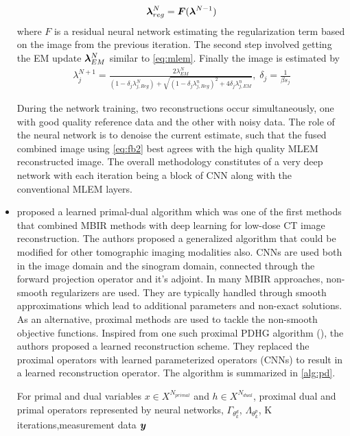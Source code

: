 \begin{itemize}
\begin{equation}\label{eq:fbs1}
\bm{\lambda}_{reg}^N = \bm{F}(\bm{\lambda}^{N-1})
\end{equation} 
where $F$ is a residual neural network estimating the regularization term based on the image from the previous iteration. 
The second step involved getting the EM update $\bm{\lambda}_{EM}^{N}$ similar to \ref{eq:mlem}. Finally the image is estimated by
\begin{equation}\label{eq:fb2}
\begin{array}{l}
\lambda_j^{N+1} 
=\frac{2 \lambda_{E M}^{N}}{\left(1-\delta_{j} \lambda_{j, R e g}^{N}\right)+\sqrt{\left(1-\delta_{j} \lambda_{j, R e g}^{n}\right)^{2}+4 \delta_{j} \lambda_{j, E M}^{n}}} ,\; \delta_{j}=\frac{1}{\beta s_{j}}
\end{array}
\end{equation}

During the network training, two reconstructions occur simultaneously, one with good quality reference data and the other with noisy data. The role of the neural network is to denoise the current estimate, such that the fused combined image using \ref{eq:fb2} best agrees with the high quality \ac{MLEM} reconstructed image. The overall methodology constitutes of a very deep network with each iteration being a block of \ac{CNN} along with the conventional \ac{MLEM} layers. 


\item \cite{adler2018learned} proposed a learned primal-dual algorithm which was one of the first methods that combined \ac{MBIR} methods with deep learning for low-dose \ac{CT} image reconstruction. The authors proposed a generalized algorithm that could be modified for other tomographic imaging modalities also. \acp{CNN} are used both in the image domain and the sinogram domain, connected through the forward projection operator and it's adjoint. In many \ac{MBIR} approaches, non-smooth regularizers are used. They are typically handled through smooth approximations which lead to additional parameters and non-exact solutions. As an alternative, proximal methods are used to tackle the non-smooth objective functions. Inspired from one such proximal \ac{PDHG} algorithm (\cite{chambolle2011first}), the authors proposed a learned reconstruction scheme. They replaced the proximal operators with learned parameterized operators (\acp{CNN}) to result in a learned reconstruction operator. The algorithm is summarized in \ref{alg:pd}. 

\begin{algorithm}
	\SetAlgoLined
	For primal and dual variables $x \in X^{N_{primal}}$ and $h \in X^{N_{dual}}$, proximal dual and primal operators represented by neural networks,  $\Gamma_{\theta_{k}^{d}}$, $\Lambda_{\theta_{k}^{p}}$, K iterations,measurement data $\bm{y}$
\end{algorithm}
\end{itemize}
